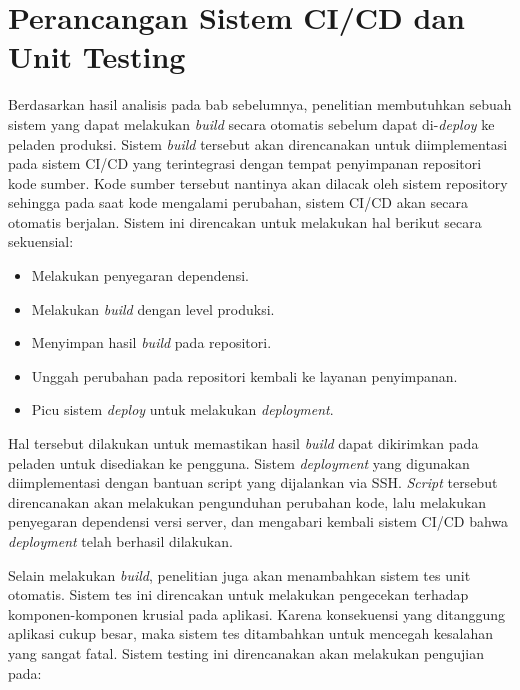     
\section{Perancangan Sistem CI/CD dan Unit Testing}
    Berdasarkan hasil analisis pada bab sebelumnya, penelitian membutuhkan sebuah sistem yang dapat
    melakukan \textit{build} secara otomatis sebelum dapat di-\textit{deploy} ke peladen produksi.
    Sistem \textit{build} tersebut akan direncanakan untuk diimplementasi pada sistem CI/CD yang
    terintegrasi dengan tempat penyimpanan repositori kode sumber. Kode sumber tersebut nantinya akan
    dilacak oleh sistem repository sehingga pada saat kode mengalami perubahan, sistem CI/CD akan
    secara otomatis berjalan. Sistem ini direncakan untuk melakukan hal berikut secara sekuensial:
    
    \begin{itemize}
        \item Melakukan penyegaran dependensi.
        \item Melakukan \textit{build} dengan level produksi.
        \item Menyimpan hasil \textit{build} pada repositori.
        \item Unggah perubahan pada repositori kembali ke layanan penyimpanan.
        \item Picu sistem \textit{deploy} untuk melakukan \textit{deployment}.
    \end{itemize}
    
    Hal tersebut dilakukan untuk memastikan hasil \textit{build} dapat dikirimkan pada peladen untuk disediakan
    ke pengguna. Sistem \textit{deployment} yang digunakan diimplementasi dengan bantuan script yang dijalankan
    via SSH. \textit{Script} tersebut direncanakan akan melakukan pengunduhan perubahan kode, lalu melakukan
    penyegaran dependensi versi server, dan mengabari kembali sistem CI/CD bahwa \textit{deployment} telah
    berhasil dilakukan.
    
    Selain melakukan \textit{build}, penelitian juga akan menambahkan sistem tes unit otomatis. Sistem tes ini
    direncakan untuk melakukan pengecekan terhadap komponen-komponen krusial pada aplikasi. Karena konsekuensi
    yang ditanggung aplikasi cukup besar, maka sistem tes ditambahkan untuk mencegah kesalahan yang sangat
    fatal. Sistem testing ini direncanakan akan melakukan pengujian pada:
    
